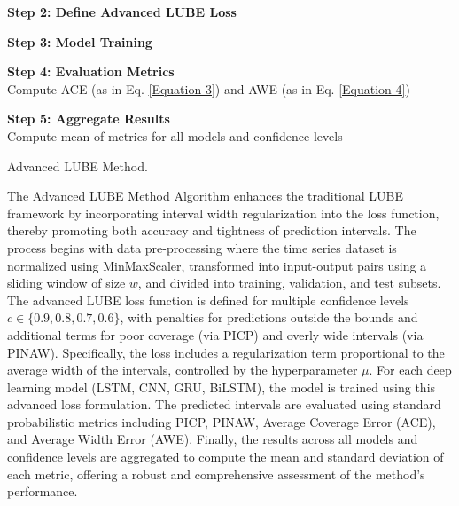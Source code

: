 \begin{itemize}
\begin{algorithm}[H]
        \textbf{Step 2: Define Advanced LUBE Loss}\\
    
        \textbf{Step 3: Model Training}\\
    
        \textbf{Step 4: Evaluation Metrics}\\
        Compute ACE (as in Eq. \eqref{Equation 3}) and AWE (as in Eq. \eqref{Equation 4})
    
        \textbf{Step 5: Aggregate Results}\\
        Compute mean of metrics for all models and confidence levels
        
        \caption{Advanced LUBE Method.}
        \end{algorithm}

        The Advanced LUBE Method Algorithm enhances the traditional LUBE framework by incorporating interval width regularization into the loss function, thereby promoting both accuracy and tightness of prediction intervals. The process begins with data pre-processing where the time series dataset is normalized using MinMaxScaler, transformed into input-output pairs using a sliding window of size $w$, and divided into training, validation, and test subsets. The advanced LUBE loss function is defined for multiple confidence levels $c \in \{0.9, 0.8, 0.7, 0.6\}$, with penalties for predictions outside the bounds and additional terms for poor coverage (via PICP) and overly wide intervals (via PINAW). Specifically, the loss includes a regularization term proportional to the average width of the intervals, controlled by the hyperparameter $\mu$. For each deep learning model (LSTM, CNN, GRU, BiLSTM), the model is trained using this advanced loss formulation. The predicted intervals are evaluated using standard probabilistic metrics including PICP, PINAW, Average Coverage Error (ACE), and Average Width Error (AWE). Finally, the results across all models and confidence levels are aggregated to compute the mean and standard deviation of each metric, offering a robust and comprehensive assessment of the method’s performance.



\end{itemize}

